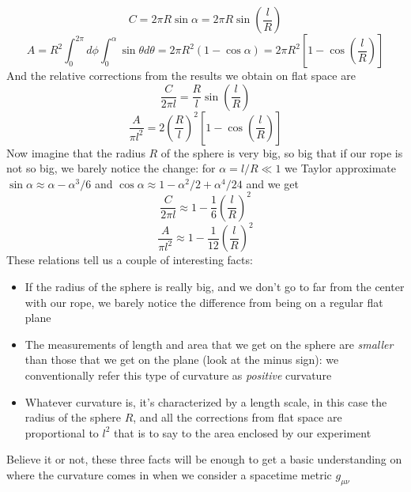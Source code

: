 \begin{equation}
C=2\pi R\sin{\alpha}=2\pi R\sin{\left(\frac{l}{R}\right)}
\end{equation}
\begin{equation}
A=R^2\int_0^{2\pi}d\phi\int_0^{\alpha}\sin{\theta}d\theta=2\pi R^2(1-\cos{\alpha})=2\pi R^2\left[1-\cos{\left(\frac{l}{R}\right)}\right]
\end{equation}
And the relative corrections from the results we obtain on flat space are
\begin{equation}
\frac{C}{2\pi l}=\frac{R}{l}\sin{\left(\frac{l}{R}\right)}
\end{equation} 
\begin{equation}
\frac{A}{\pi l^2}=2\left(\frac{R}{l}\right)^2\left[1-\cos{\left(\frac{l}{R}\right)}\right]
\end{equation}
Now imagine that the radius $R$ of the sphere is very big, so big that if our rope is not so big, we barely notice the change: for $\alpha=l/R\ll 1$ we Taylor approximate $\sin{\alpha}\approx \alpha - \alpha^3/6$ and $\cos{\alpha}\approx1-\alpha^2/2+\alpha^4/24$ and we get 
\begin{equation}
\frac{C}{2\pi l}\approx 1-\frac{1}{6}\left(\frac{l}{R}\right)^2
\end{equation}
\begin{equation}
\frac{A}{\pi l^2}\approx 1-\frac{1}{12}\left(\frac{l}{R}\right)^2
\end{equation}
These relations tell us a couple of interesting facts:
\begin{itemize}
\item If the radius of the sphere is really big, and we don't go to far from the center with our rope, we barely notice the difference from being on a regular flat plane
\item The measurements of length and area that we get on the sphere are \textit{smaller} than those that we get on the plane (look at the minus sign): we conventionally refer this type of curvature as \textit{positive} curvature
\item Whatever curvature is, it's characterized by a length scale, in this case the radius of the sphere $R$, and all the corrections from flat space are proportional to $l^2$ that is to say to the area enclosed by our experiment
\end{itemize}
Believe it or not, these three facts will be enough to get a basic understanding on where the curvature comes in when we consider a spacetime metric $g_{\mu\nu}$ 
